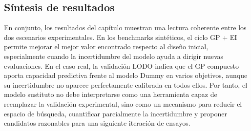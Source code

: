\subsection{Síntesis de resultados}
En conjunto, los resultados del capítulo muestran una lectura coherente entre los dos escenarios experimentales. En los benchmarks sintéticos, el ciclo GP + EI permite mejorar el mejor valor encontrado respecto al diseño inicial, especialmente cuando la incertidumbre del modelo ayuda a dirigir nuevas evaluaciones. En el caso real, la validación LODO indica que el GP compuesto aporta capacidad predictiva frente al modelo Dummy en varios objetivos, aunque su incertidumbre no aparece perfectamente calibrada en todos ellos. Por tanto, el modelo sustituto no debe interpretarse como una herramienta capaz de reemplazar la validación experimental, sino como un mecanismo para reducir el espacio de búsqueda, cuantificar parcialmente la incertidumbre y proponer candidatos razonables para una siguiente iteración de ensayos.
